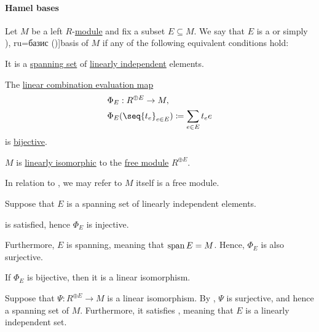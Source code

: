 \paragraph{Hamel bases}

\begin{definition}\label{def:hamel_basis}\mimprovised
  Let \( M \) be a left \( R \)-\hyperref[def:module]{module} and fix a subset \( E \subseteq M \). We say that \( E \) is a  or simply \term[bg=базис (\cite[\textnumero 2.1.5]{ПетровЗяпков2010}), ru=базис (\cite[sec. 3.7]{Тыртышников2007})]{basis} of \( M \) if any of the following equivalent conditions hold:

  \begin{thmenum}
     It is a \hyperref[thm:span_via_linear_combinations]{spanning set} of \hyperref[def:linear_dependence]{linearly independent} elements.

     The \hyperref[thm:free_semimodule_universal_property]{linear combination evaluation map}
    \begin{equation*}
      \begin{aligned}
        &\Phi_E: R^{\oplus E} \to M, \\
        &\Phi_E( \seq{ t_e }_{e \in E} ) \coloneqq \sum_{e \in E} t_e e
      \end{aligned}
    \end{equation*}
    is \hyperref[def:function_invertibility/bijective]{bijective}.

     \( M \) is \hyperref[def:semimodule/homomorphism]{linearly isomorphic} to the \hyperref[def:free_semimodule]{free module} \( R^{\oplus E} \).
  \end{thmenum}
\end{definition}
\begin{comments}
  \item In relation to , we may refer to \( M \) itself is a free module.
\end{comments}
\begin{defproof}
   Suppose that \( E \) is a spanning set of linearly independent elements.

   is satisfied, hence \( \Phi_E \) is injective.

  Furthermore, \( E \) is spanning, meaning that \( \operatorname{span} E = M \). Hence, \( \Phi_E \) is also surjective.

   If \( \Phi_E \) is bijective, then it is a linear isomorphism.

   Suppose that \( \Psi: R^{\oplus E} \to M \) is a linear isomorphism. By , \( \Psi \) is surjective, and hence a spanning set of \( M \). Furthermore, it satisfies , meaning that \( E \) is a linearly independent set.
\end{defproof}

